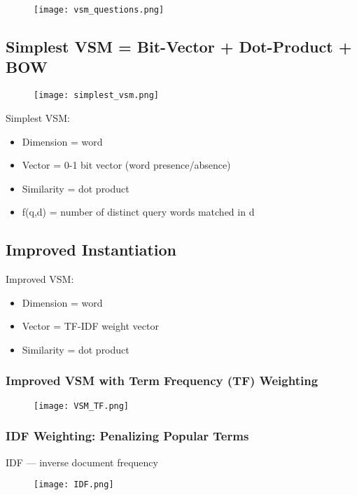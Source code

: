 \begin{figure}[H]
    \centering
    \texttt{[image: vsm\_questions.png]}
\end{figure}


\subsection{Simplest VSM = Bit-Vector + Dot-Product + BOW}
\begin{figure}[H]
    \centering
    \texttt{[image: simplest\_vsm.png]}
\end{figure}

Simplest VSM:
\begin{itemize}
\item Dimension = word
\item Vector = 0-1 bit vector (word presence/absence)
\item Similarity = dot product
\item f(q,d) = number of distinct query words matched in d
\end{itemize}


\subsection{Improved Instantiation}

Improved VSM:
\begin{itemize}
\item Dimension = word
\item Vector = TF-IDF weight vector
\item Similarity = dot product
\end{itemize}

\subsubsection{Improved VSM with Term Frequency (TF) Weighting}
\begin{figure}[H]
    \centering
    \texttt{[image: VSM\_TF.png]}
\end{figure}

\subsubsection{IDF Weighting: Penalizing Popular Terms}
IDF — inverse document frequency
\begin{figure}[H]
    \centering
    \texttt{[image: IDF.png]}
\end{figure}

